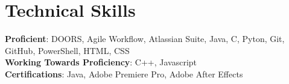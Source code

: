 \documentclass[letterpaper,11pt]{article}
\begin{document}
\section{Technical Skills}
 \begin{itemize}[leftmargin=0.15in, label={}]
    \small{\item{
     \textbf{Proficient}{: DOORS, Agile Workflow, Atlassian Suite, Java, C, Pyton, Git, GitHub, PowerShell, HTML, CSS} \\
     \textbf{Working Towards Proficiency}{: C++, Javascript} \\
     \textbf{Certifications}{: Java, Adobe Premiere Pro, Adobe After Effects}
    }}
 \end{itemize}

\end{document}
